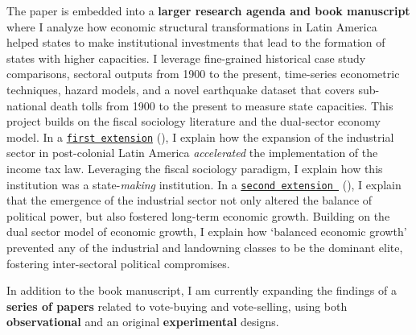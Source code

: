\documentclass[10pt,stdletter,dateno,sigleft]{newlfm} %
\begin{document}
\begin{newlfm}
The paper is embedded into a {\bf larger research agenda and book manuscript} where I analyze how economic structural transformations in Latin America helped states to make institutional investments that lead to the formation of states with higher capacities. I leverage fine-grained historical case study comparisons, sectoral outputs from 1900 to the present, time-series econometric techniques, hazard models, and a novel earthquake dataset that covers sub-national death tolls from 1900 to the present to measure state capacities. This project builds on the fiscal sociology literature and the dual-sector economy model. In a \href{http://github.com/hbahamonde/IncomeTaxAdoption/raw/master/Bahamonde_IncomeTaxAdoption.pdf}{\texttt{first extension}} (\emph{\unskip}), I explain how the expansion of the industrial sector in post-colonial Latin America \emph{accelerated} the implementation of the income tax law. Leveraging the fiscal sociology paradigm, I explain how this institution was a state-\emph{making} institution. In a \href{https://github.com/hbahamonde/Negative_Link_Paper/raw/master/Bahamonde_NegativeLink.pdf}{\texttt{second extension }} (\emph{\unskip}), I explain that the emergence of the industrial sector not only altered the balance of political power, but also fostered long-term economic growth. Building on the dual sector model of economic growth, I explain how `balanced economic growth' prevented any of the industrial and landowning classes to be the dominant elite, fostering inter-sectoral political compromises.

In addition to the book manuscript, I am currently expanding the findings of a {\bf series of papers} related to vote-buying and vote-selling, using both {\bf observational} and an original {\bf experimental} designs. 


\end{newlfm}
\end{document}
